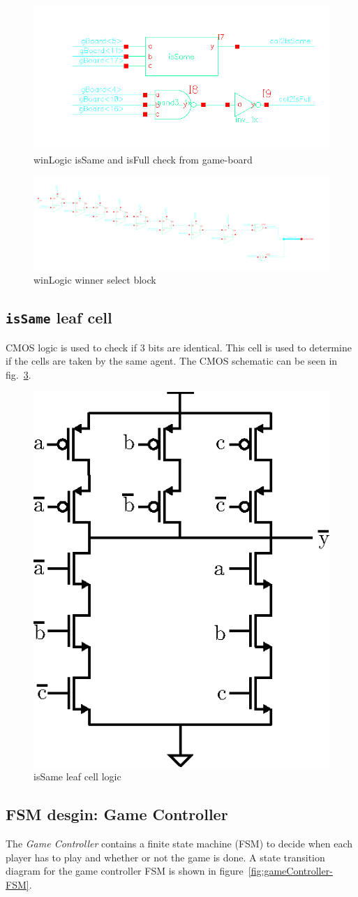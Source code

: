 \documentclass[]{article}
\begin{document}
\begin{figure}
\centering
\includegraphics[width=.5\textwidth]{winLogic-schem_2}
\caption{winLogic isSame and isFull check from game-board}
\label{fig:winLogic-schem2}
\end{figure}

\begin{figure}
\centering
\includegraphics[width=.8\textwidth]{winLogic-schem_3}
\caption{winLogic winner select block}
\label{fig:winLogic-schem3}
\end{figure}


\subsection{\texttt{isSame} leaf cell}
\label{sec:isSame}
CMOS logic is used to check if 3 bits are identical. This cell is used to determine if the cells are taken by the same agent. The CMOS schematic can be seen in fig.~\ref{fig:isSame-cmos}.

\begin{figure}
\centering
\includegraphics[width=.2\textwidth]{isSame-cmos}
\caption{isSame leaf cell logic}
\label{fig:isSame-cmos}
\end{figure}

\subsection{FSM desgin: Game Controller}
The \emph{Game Controller} contains a finite state machine (FSM) to decide when each player has to play and whether or not the game is done. A state transition diagram for the game controller FSM is shown in figure~\ref{fig:gameController-FSM}.
\end{document}
